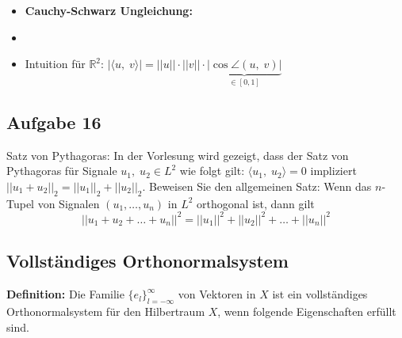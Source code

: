 \documentclass[11pt]{article}
\begin{document}
\begin{itemize}[leftmargin=0pt]

    \item[] \textbf{Cauchy-Schwarz Ungleichung:}
    \item[] 
    \item[] Intuition für $\mathbb{R}^2$: \hspace{10pt} $\left| \langle u, \; v \rangle \right| = ||u|| \cdot ||v|| \cdot \underbrace{\left| \cos \angle(u, \; v) \right|}_{\in [0,1]}$
\end{itemize}

\vspace*{-1.5cm}
\subsection*{Aufgabe 16}
\vspace*{-0.5cm}
Satz von Pythagoras: In der Vorlesung wird gezeigt, dass der Satz von Pythagoras für Signale $u_1, \; u_2 \in L^2$ wie folgt gilt: $\langle u_1, \; u_2 \rangle = 0$ impliziert $||u_1 + u_2||_2 = ||u_1||_2 + ||u_2||_2$. Beweisen Sie den allgemeinen Satz: Wenn das $n$-Tupel von Signalen $(u_1, \dots, u_n)$ in $L^2$ orthogonal ist, dann gilt
$$||u_1 + u_2 + \dots + u_n||^2 = ||u_1||^2 + ||u_2||^2 + \dots + ||u_n||^2$$

\vspace*{-0.5cm}

\pagebreak

\subsection*{Vollständiges Orthonormalsystem}
\vspace*{-0.5cm}
\textbf{Definition:} Die Familie $\{e_l\}_{l = -\infty}^\infty$ von Vektoren in $X$ ist ein vollständiges Orthonormalsystem für den Hilbertraum $X$, wenn folgende Eigenschaften erfüllt sind.
\end{document}
